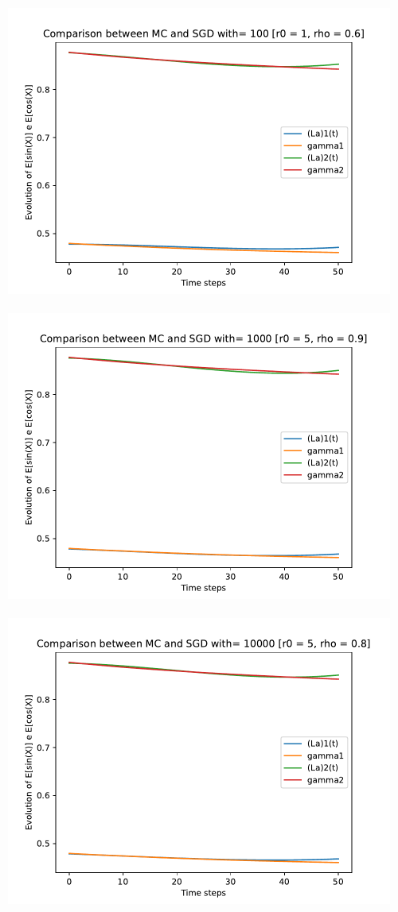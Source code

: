 \documentclass[a4paper,11pt,openright]{report}
\begin{document}
\begin{figure}[H]
\centering
\includegraphics[width=0.9\textwidth]{images/graphs T = 0.5/n = 3, M = 100 sine and cosine.pdf}
\end{figure}
\begin{figure}[H]
\centering
\includegraphics[width=0.9\textwidth]{images/graphs T = 0.5/n = 3, M = 1000 sine and cosine.pdf}
\end{figure}
\begin{figure}[H]
\centering
\includegraphics[width=0.9\textwidth]{images/graphs T = 0.5/n = 3, M = 10000 sine and cosine.pdf}
\end{figure}
\newpage
\end{document}
